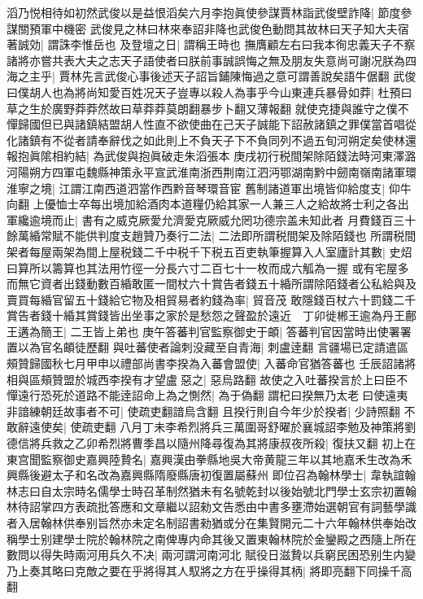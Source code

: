 滔乃悦相待如初然武俊以是益恨滔矣六月李抱眞使參謀賈林詣武俊壁詐降|{
	節度參謀關預軍中機密}
武俊見之林曰林來奉詔非降也武俊色動問其故林曰天子知大夫宿著誠効|{
	謂誅李惟岳也}
及登壇之日|{
	謂稱王時也}
撫膺顧左右曰我本徇忠義天子不察諸將亦嘗共表大夫之志天子語使者曰朕前事誠誤悔之無及朋友失意尚可謝况朕為四海之主乎|{
	賈林先言武俊心事後述天子詔旨鋪陳悔過之意可謂善說矣語牛倨翻}
武俊曰僕胡人也為將尚知愛百姓况天子豈專以殺人為事乎今山東連兵暴骨如莽|{
	杜預曰草之生於廣野莽莽然故曰草莽莽莫朗翻暴步卜翻又薄報翻}
就使克捷與誰守之僕不憚歸國但已與諸鎮結盟胡人性直不欲使曲在己天子誠能下詔赦諸鎮之罪僕當首唱從化諸鎮有不從者請奉辭伐之如此則上不負天子下不負同列不過五旬河朔定矣使林還報抱眞隂相約結|{
	為武俊與抱眞破走朱滔張本}
庚戌初行税間架除陌錢法時河東澤潞河陽朔方四軍屯魏縣神策永平宣武淮南浙西荆南江泗沔鄂湖南黔中劒南嶺南諸軍環淮寧之境|{
	江謂江南西道泗當作西黔音琴環音宦}
舊制諸道軍出境皆仰給度支|{
	仰牛向翻}
上優恤士卒每出境加給酒肉本道糧仍給其家一人兼三人之給故將士利之各出軍纔逾境而止|{
	書有之威克厥愛允濟愛克厥威允罔功德宗盖未知此者}
月費錢百三十餘萬緍常賦不能供判度支趙贊乃奏行二法|{
	二法即所謂税間架及除陌錢也}
所謂税間架者每屋兩架為間上屋税錢二千中税千下税五百吏執筆握算入人室廬計其數|{
	史炤曰算所以籌算也其法用竹徑一分長六寸二百七十一枚而成六觚為一握}
或有宅屋多而無它資者出錢動數百緍敢匿一間杖六十賞告者錢五十緍所謂除陌錢者公私給與及賣買每緍官留五十錢給它物及相貿易者約錢為率|{
	貿音茂}
敢隱錢百杖六十罰錢二千賞告者錢十緍其賞錢皆出坐事之家於是愁怨之聲盈於遠近　丁卯徙郴王逾為丹王鄜王遘為簡王|{
	二王皆上弟也}
庚午答蕃判官監察御史于頔|{
	答蕃判官因當時出使署署置以為官名頔徒歷翻}
與吐蕃使者論刺没藏至自青海|{
	刺盧逹翻}
言疆場已定請遣區頰贊歸國秋七月甲申以禮部尚書李揆為入蕃會盟使|{
	入蕃命官猶答蕃也}
壬辰詔諸將相與區頰贊盟於城西李揆有才望盧惡之|{
	惡烏路翻}
故使之入吐蕃揆言於上曰臣不憚遠行恐死於道路不能逹詔命上為之惻然|{
	為于偽翻}
謂杞曰揆無乃太老曰使遠夷非諳練朝廷故事者不可|{
	使疏吏翻諳烏含翻}
且揆行則自今年少於揆者|{
	少詩照翻}
不敢辭遠使矣|{
	使疏吏翻}
八月丁未李希烈將兵三萬圍哥舒曜於襄城詔李勉及神策將劉德信將兵救之乙卯希烈將曹季昌以隨州降尋復為其將康叔夜所殺|{
	復扶又翻}
初上在東宫聞監察御史嘉興陸贄名|{
	嘉興漢由拳縣地吳大帝黄龍三年以其地嘉禾生改為禾興縣後避太子和名改為嘉興縣隋廢縣唐初復置屬蘇州}
即位召為翰林學士|{
	韋執誼翰林志曰自太宗時名儒學士時召革制然猶未有名號乾封以後始號北門學士玄宗初置翰林待詔掌四方表疏批答應和文章繼以詔勑文告悉由中書多壅滯始選朝官有詞藝學識者入居翰林供奉别旨然亦未定名制詔書勑猶或分在集賢開元二十六年翰林供奉始改稱學士别建學士院於翰林院之南俾專内命其後又置東翰林院於金鑾殿之西隨上所在}
數問以得失時兩河用兵久不决|{
	兩河謂河南河北}
賦役日滋贄以兵窮民困恐别生内變乃上奏其略曰克敵之要在乎將得其人馭將之方在乎操得其柄|{
	將即亮翻下同操千高翻}
